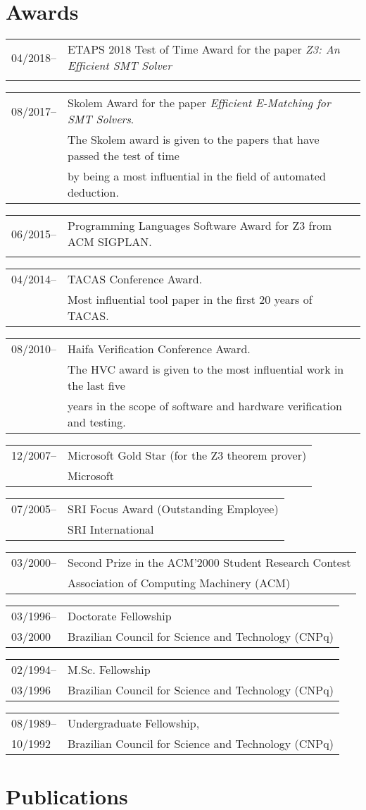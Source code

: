 \documentclass{article}
\newcommand{\job}[4]{\begin{flushleft}
                                        \begin{tabular}{ll}
                                         #1-- & #3 \\
                     #2 & #4 \\
                    \end{tabular}
                                        \end{flushleft}
                    }
\newcommand{\award}[4]{\job{#1}{#2}{#3}{#4}}
\begin{document}
\section*{Awards}
\award{04/2018}{ }{ETAPS 2018 Test of Time Award for the paper {\em Z3: An Efficient SMT Solver}}{}
\award{08/2017}{ }{Skolem Award for the paper {\em Efficient E-Matching for SMT Solvers}.}
                  {The Skolem award is given to the papers that have passed the test of time \\
                   & by being a most influential in the field of automated deduction.}
\award{06/2015}{ }{Programming Languages Software Award for Z3 from ACM SIGPLAN.}{}
\award{04/2014}{ }{TACAS Conference Award. }  { Most influential tool paper in the first 20 years of TACAS.}
\award{08/2010}{ }{Haifa Verification Conference Award. } { The HVC award is given to the most influential work in the last five \\
                   & years in the scope of software and hardware verification and testing. }
\award{12/2007}{ }{Microsoft Gold Star (for the Z3 theorem prover)}{Microsoft}
\award{07/2005}{ }{SRI Focus Award (Outstanding Employee)}{SRI International}
\award{03/2000}{ }{Second Prize in the ACM'2000 Student Research Contest}{Association of Computing Machinery (ACM)}
\award{03/1996}{03/2000}{Doctorate Fellowship}{Brazilian Council for Science and Technology (CNPq)}
\award{02/1994}{03/1996}{M.Sc. Fellowship}{Brazilian Council for Science and Technology (CNPq)}
\award{08/1989}{10/1992}{Undergraduate Fellowship,}{Brazilian Council for Science and Technology (CNPq)}

\section*{Publications}
\end{document}
